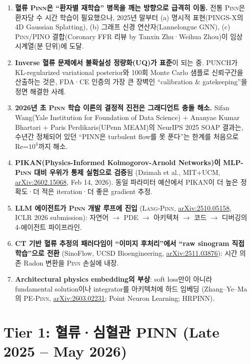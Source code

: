 \documentclass[11pt,a4paper,oneside]{report}
\newcommand{\pinn}{\textsc{Pinn}}
\newcommand{\langpinn}{\textsc{Lang-Pinn}}
\newcommand{\arxivid}[1]{\href{https://arxiv.org/abs/#1}{arXiv:#1}}
\begin{document}
\begin{enumerate}
\item \textbf{혈류 \pinn{}은 ``환자별 재학습'' 병목을 깨는 방향으로 급격히 이동.} 전통 \pinn{}은 환자당 수 시간 학습이 필요했으나, 2025년 말부터 (a) 명시적 표현(PINGS-X의 4D Gaussian Splatting), (b) 그래프 신경 연산자(Lannelongue GNN), (c) \pinn{}/PINO 결합(Coronary FFR 리뷰 by Tanxin Zhu·Weihua Zhou)이 임상 시계열(분 단위)에 도달.

\item \textbf{Inverse 혈류 문제에서 불확실성 정량화(UQ)가 표준}이 되는 중. PUNCH가 KL-regularized variational posterior와 100회 Monte Carlo 샘플로 신뢰구간을 산출하는 것은, FDA·CE 인증의 가장 큰 장벽인 ``calibration \& gatekeeping''을 정면 해결한 사례.

\item \textbf{2026년 초 \pinn{} 학습 이론의 결정적 진전은 그래디언트 충돌 해소.} Sifan Wang(Yale Institution for Foundation of Data Science) + Ananyae Kumar Bhartari + Paris Perdikaris(UPenn MEAM)의 NeurIPS 2025 SOAP 결과는, 수년간 정체되어 있던 ``PINN은 turbulent flow를 못 푼다''는 한계를 처음으로 Re=$10^4$까지 해소.

\item \textbf{PIKAN(Physics-Informed Kolmogorov-Arnold Networks)이 MLP-\pinn{} 대비 우위가 통제 실험으로 검증}됨 (Dzimah et al., MIT+UCM, \arxivid{2602.15068}, Feb 14, 2026). 동일 파라미터 예산에서 PIKAN이 더 높은 정확도·더 적은 iteration·더 좋은 gradient 추정.

\item \textbf{LLM 에이전트가 \pinn{} 개발 루프에 진입} (\langpinn{}, \arxivid{2510.05158}, ICLR 2026 submission): 자연어 $\rightarrow$ PDE $\rightarrow$ 아키텍처 $\rightarrow$ 코드 $\rightarrow$ 디버깅의 4-에이전트 파이프라인.

\item \textbf{CT 기반 혈류 추정의 패러다임이 ``이미지 후처리''에서 ``raw sinogram 직접 학습''으로 전환} (SinoFlow, UCSD Bioengineering, \arxivid{2511.03876}): 시간 의존 Radon 변환을 \pinn{} 손실에 내장.

\item \textbf{Architectural physics embedding의 부상}: soft loss만이 아니라 fundamental solution이나 integrator를 아키텍처에 하드 임베딩 (Zhang--Ye--Ma의 PE-\pinn{}, \arxivid{2603.02231}; Point Neuron Learning; HRPINN).
\end{enumerate}

\section{Tier 1: 혈류·심혈관 PINN (Late 2025 -- May 2026)}
\end{document}
